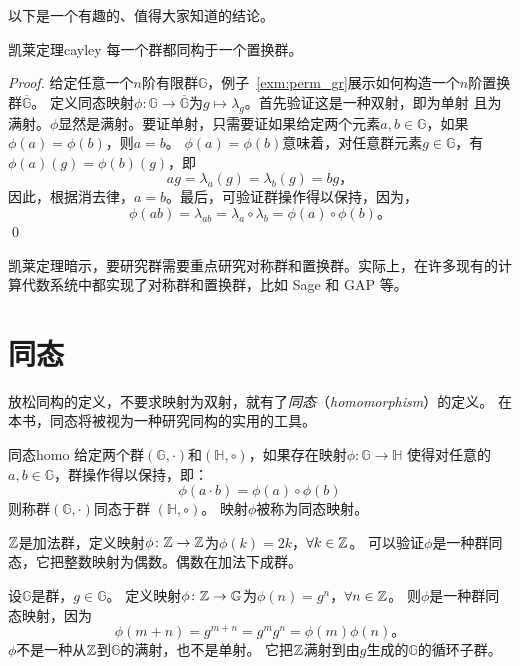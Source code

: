 以下是一个有趣的、值得大家知道的结论。
	\begin{theorem}{凯莱定理}{cayley}
		每一个群都同构于一个置换群。
	\end{theorem}
\begin{proof}
	给定任意一个$n$阶有限群$\mathbb{G}$，例子~\ref{exm:perm_gr}展示如何构造一个$n$阶置换群$\overline{\mathbb{G}}$。
	定义同态映射$\phi\colon \mathbb{G} \to \overline{\mathbb{G}}$为$g \mapsto \lambda_g$。首先验证这是一种双射，即为单射
	且为满射。$\phi$显然是满射。要证单射，只需要证如果给定两个元素$a,b \in \mathbb{G}$，如果$\phi(a) = \phi(b)$，则$a = b$。
	$\phi(a) = \phi(b)$意味着，对任意群元素$g \in \mathbb{G}$，有$\phi(a) (g)= \phi(b)(g)$，即
		\[ag = \lambda_a(g) = \lambda_b(g) = bg\text{，}\]
	因此，根据消去律，$a=b$。最后，可验证群操作得以保持，因为，
		\[\phi(ab) = \lambda_{ab} = \lambda_a \circ \lambda_b = \phi(a) \circ \phi(b)\text{。}\]
	\qed
\end{proof}
凯莱定理暗示，要研究群需要重点研究对称群和置换群。实际上，在许多现有的计算代数系统中都实现了对称群和置换群，比如 Sage 和 GAP 等。

\section{同态} 
\label{sec:homo}
放松同构的定义，不要求映射为双射，就有了\emph{同态}（\emph{homomorphism}）的定义。
在本书，同态将被视为一种研究同构的实用的工具。

\begin{definition}{同态}{homo}
	给定两个群$(\mathbb{G}, \cdot)$和$(\mathbb{H}, \circ)$，如果存在映射$\phi\colon \mathbb{G} \to \mathbb{H}$
	使得对任意的$a, b\in \mathbb{G}$，群操作得以保持，即：
	\[\phi(a \cdot b) = \phi(a)\circ \phi(b)\]
	则称群$(\mathbb{G}, \cdot)$同态于群 $(\mathbb{H}, \circ)$。
	映射$\phi$被称为同态映射。
\end{definition}

\begin{example}
${\mathbb Z}$是加法群，定义映射$\phi\colon {\mathbb Z} \to {\mathbb Z}$为$\phi(k) = 2k$，$\forall k \in {\mathbb Z}$。
可以验证$\phi$是一种群同态，它把整数映射为偶数。偶数在加法下成群。
\end{example}

\begin{example}
		设$\mathbb{G}$是群，$g\in \mathbb{G}$。
		定义映射$\phi\colon {\mathbb Z} \to \mathbb{G}$为$\phi(n) = g^n$，$\forall n \in {\mathbb Z}$。
		则$\phi$是一种群同态映射，因为
		\[\phi(m+n) = g^{m+n} = g^m g^n = \phi(m) \phi(n)\text{。}\]
		$\phi$不是一种从${\mathbb Z}$到$\mathbb{G}$的满射，也不是单射。
		它把${\mathbb Z}$满射到由$g$生成的$\mathbb{G}$的循环子群。 
\end{example}
	
